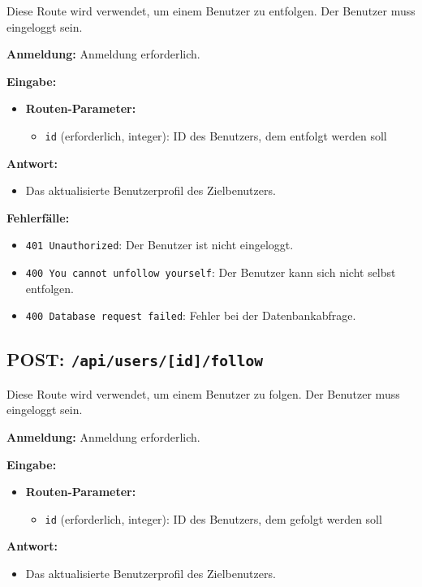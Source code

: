 \documentclass[a4paper,12pt]{article}
\begin{document}
Diese Route wird verwendet, um einem Benutzer zu entfolgen. Der Benutzer muss
eingeloggt sein.

\textbf{Anmeldung:} Anmeldung erforderlich.

\textbf{Eingabe:}
\begin{itemize}
    \item \textbf{Routen-Parameter:}
    \begin{itemize}
        \item \texttt{id} (erforderlich, integer):
            ID des Benutzers, dem entfolgt werden soll
    \end{itemize}
\end{itemize}

\textbf{Antwort:}
\begin{itemize}
    \item Das aktualisierte Benutzerprofil des Zielbenutzers.
\end{itemize}

\textbf{Fehlerfälle:}
\begin{itemize}
    \item \texttt{401 Unauthorized}:
        Der Benutzer ist nicht eingeloggt.
    \item \texttt{400 You cannot unfollow yourself}:
        Der Benutzer kann sich nicht selbst entfolgen.
    \item \texttt{400 Database request failed}:
        Fehler bei der Datenbankabfrage.
\end{itemize}

\subsection{POST: \texttt{/api/users/[id]/follow}}

Diese Route wird verwendet, um einem Benutzer zu folgen. Der Benutzer muss
eingeloggt sein.

\textbf{Anmeldung:} Anmeldung erforderlich.

\textbf{Eingabe:}
\begin{itemize}
    \item \textbf{Routen-Parameter:}
    \begin{itemize}
        \item \texttt{id} (erforderlich, integer):
            ID des Benutzers, dem gefolgt werden soll
    \end{itemize}
\end{itemize}

\textbf{Antwort:}
\begin{itemize}
    \item Das aktualisierte Benutzerprofil des Zielbenutzers.
\end{itemize}
\end{document}
